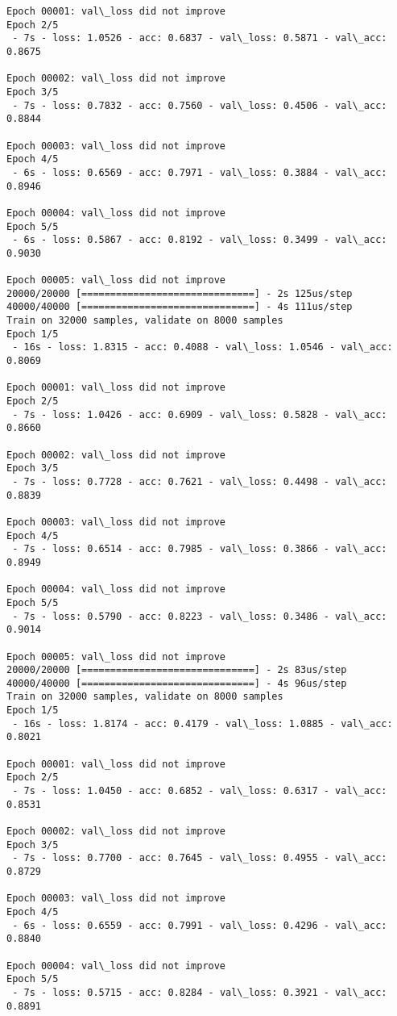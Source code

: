 \documentclass[11pt]{article}
\begin{document}
\begin{Verbatim}[commandchars=\\\{\}]
Epoch 00001: val\_loss did not improve
Epoch 2/5
 - 7s - loss: 1.0526 - acc: 0.6837 - val\_loss: 0.5871 - val\_acc: 0.8675

Epoch 00002: val\_loss did not improve
Epoch 3/5
 - 7s - loss: 0.7832 - acc: 0.7560 - val\_loss: 0.4506 - val\_acc: 0.8844

Epoch 00003: val\_loss did not improve
Epoch 4/5
 - 6s - loss: 0.6569 - acc: 0.7971 - val\_loss: 0.3884 - val\_acc: 0.8946

Epoch 00004: val\_loss did not improve
Epoch 5/5
 - 6s - loss: 0.5867 - acc: 0.8192 - val\_loss: 0.3499 - val\_acc: 0.9030

Epoch 00005: val\_loss did not improve
20000/20000 [==============================] - 2s 125us/step
40000/40000 [==============================] - 4s 111us/step
Train on 32000 samples, validate on 8000 samples
Epoch 1/5
 - 16s - loss: 1.8315 - acc: 0.4088 - val\_loss: 1.0546 - val\_acc: 0.8069

Epoch 00001: val\_loss did not improve
Epoch 2/5
 - 7s - loss: 1.0426 - acc: 0.6909 - val\_loss: 0.5828 - val\_acc: 0.8660

Epoch 00002: val\_loss did not improve
Epoch 3/5
 - 7s - loss: 0.7728 - acc: 0.7621 - val\_loss: 0.4498 - val\_acc: 0.8839

Epoch 00003: val\_loss did not improve
Epoch 4/5
 - 7s - loss: 0.6514 - acc: 0.7985 - val\_loss: 0.3866 - val\_acc: 0.8949

Epoch 00004: val\_loss did not improve
Epoch 5/5
 - 7s - loss: 0.5790 - acc: 0.8223 - val\_loss: 0.3486 - val\_acc: 0.9014

Epoch 00005: val\_loss did not improve
20000/20000 [==============================] - 2s 83us/step
40000/40000 [==============================] - 4s 96us/step
Train on 32000 samples, validate on 8000 samples
Epoch 1/5
 - 16s - loss: 1.8174 - acc: 0.4179 - val\_loss: 1.0885 - val\_acc: 0.8021

Epoch 00001: val\_loss did not improve
Epoch 2/5
 - 7s - loss: 1.0450 - acc: 0.6852 - val\_loss: 0.6317 - val\_acc: 0.8531

Epoch 00002: val\_loss did not improve
Epoch 3/5
 - 7s - loss: 0.7700 - acc: 0.7645 - val\_loss: 0.4955 - val\_acc: 0.8729

Epoch 00003: val\_loss did not improve
Epoch 4/5
 - 6s - loss: 0.6559 - acc: 0.7991 - val\_loss: 0.4296 - val\_acc: 0.8840

Epoch 00004: val\_loss did not improve
Epoch 5/5
 - 7s - loss: 0.5715 - acc: 0.8284 - val\_loss: 0.3921 - val\_acc: 0.8891


\end{Verbatim}
\end{document}
